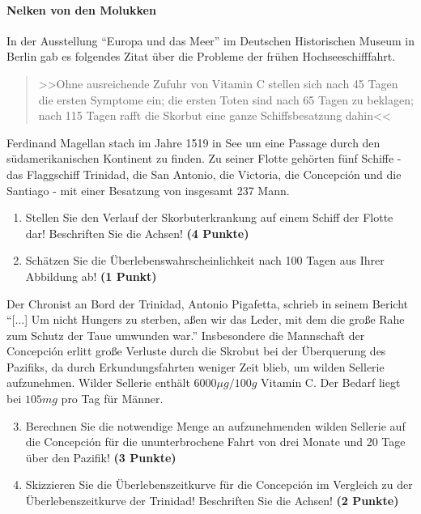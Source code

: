 \documentclass[a4paper, 10pt]{scrartcl}\usepackage[]{graphicx}\usepackage[]{xcolor}
\begin{document}
\paragraph{Nelken von den Molukken}



In der Ausstellung "`Europa und das Meer"' im Deutschen Historischen Museum in
Berlin gab es folgendes Zitat {\"u}ber die Probleme der fr{\"u}hen Hochseeschifffahrt.

\begin{quote}
  >>Ohne ausreichende Zufuhr von Vitamin C stellen sich nach 45 Tagen die
  ersten Symptome ein; die ersten Toten sind nach 65 Tagen zu beklagen;
  nach 115 Tagen rafft die Skorbut eine ganze Schiffsbesatzung dahin<<
\end{quote}

Ferdinand Magellan stach im Jahre 1519 in See um eine Passage durch den
s{\"u}damerikanischen Kontinent zu finden. Zu seiner Flotte geh{\"o}rten
f{\"u}nf Schiffe - das Flaggschiff Trinidad, die San Antonio, die Victoria, die
Concepci{\'o}n und die Santiago - mit einer Besatzung von insgesamt
237 Mann. 

\begin{enumerate}
\item Stellen Sie den Verlauf der Skorbuterkrankung auf einem Schiff der
  Flotte dar! Beschriften Sie die Achsen! \textbf{(4 Punkte)} 
\item Sch{\"a}tzen Sie die {\"U}berlebenswahrscheinlichkeit nach 100 Tagen
  aus Ihrer Abbildung ab! \textbf{(1 Punkt)} 
\end{enumerate}


Der Chronist an Bord der Trinidad, Antonio Pigafetta, schrieb in seinem
Bericht "`[...] Um nicht Hungers zu sterben, a{\ss}en wir das Leder, mit dem
die gro{\ss}e Rahe zum Schutz der Taue umwunden war."' Insbesondere die
Mannschaft der Concepci{\'o}n erlitt gro{\ss}e Verluste durch die Skrobut bei der
{\"U}berquerung des Pazifiks, da durch Erkundungsfahrten weniger Zeit blieb, um
wilden Sellerie aufzunehmen. Wilder Sellerie enth{\"a}lt
$6000\mu g/100g$ Vitamin C. Der Bedarf liegt bei
$105mg$ pro Tag f{\"u}r M{\"a}nner.

\begin{enumerate}
  \setcounter{enumi}{2}
\item Berechnen Sie die notwendige Menge an aufzunehmenden wilden Sellerie
  auf die Concepci{\'o}n f{\"u}r die ununterbrochene Fahrt von drei Monate und 20
  Tage {\"u}ber den Pazifik! \textbf{(3 Punkte)}
\item Skizzieren Sie die {\"U}berlebenszeitkurve f{\"u}r die Concepci{\'o}n im
  Vergleich zu der {\"U}berlebenszeitkurve der Trinidad! Beschriften Sie die
  Achsen! \textbf{(2 Punkte)}
\end{enumerate}
\end{document}
